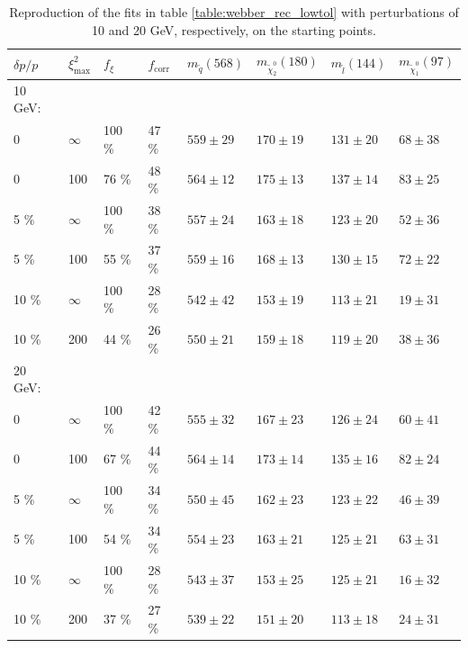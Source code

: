 \documentclass[twoside,english]{uiofysmaster}
\begin{document}


\begin{table}[hbt]
	\centering
	\begin{tabular}{| l | l | l | l  || l | l | l | l |}
		\hline
		$\delta p/p$ & $\xi^2_\mathrm{max}$ & $f_\xi$ & $f_\mathrm{corr}$ & $m_{\tilde q} (568)$ & $m_{\tilde \chi_2^0} (180)$ & $m_{\tilde l} (144)$ & $m_{\tilde \chi_1^0} (97)$ \\
		\hline \hline
		10 GeV: & & & & & & & \\ 
		\hline
		0 & 	$\infty$ &	100 \%	& 47 \%	& $559 \pm 29$	&	$170 \pm 19$	&	$131 \pm 20$	& 	$68 \pm 38$	\\
		0 &		100 &		76 \%	& 48 \% & $564 \pm 12$	&	$175 \pm 13$		&	$137 \pm 14$	&	$83 \pm 25$	\\
		5 \% &	$\infty$ &	100 \%	& 38 \% & $557 \pm 24$	& 	$163 \pm 18$	&	$123 \pm 20$&	$52 \pm 36$ \\
		5 \% &	100 &		55 \%	& 37 \% & $559 \pm 16$	&	$168 \pm 13$	& 	$130 \pm 15$	&	$72 \pm 22$	\\
		10 \% &	$\infty$ &	100 \%	& 28 \% & $542 \pm 42$	&	$153 \pm 19$	&	$113 \pm 21$&	$19 \pm 31$	\\
		10 \% &	200 &		44 \%	& 26 \% & $550 \pm 21$	& 	$159 \pm 18$	&	$119 \pm 20$&	$38 \pm 36$ \\
		\hline
		20 GeV: & & & & & & & \\ 
		\hline
		0 & 	$\infty$ &	100 \%	& 42 \%	& $555 \pm 32$	&	$167 \pm 23$	&	$126 \pm 24$	& 	$60 \pm 41$	\\
		0 &		100 &		67 \%	& 44 \% & $564 \pm 14$	&	$173 \pm 14$	&	$135 \pm 16$	&	$82 \pm 24$	\\
		5 \% &	$\infty$ &	100 \%	& 34 \% & $550 \pm 45$	& 	$162 \pm 23$	&	$123 \pm 22$&	$46 \pm 39$ \\
		5 \% &	100 &		54 \%	& 34 \% & $554 \pm 23$	&	$163 \pm 21$	& 	$125 \pm 21$	&	$63 \pm 31$	\\
		10 \% &	$\infty$ &	100 \%	& 28 \% & $543 \pm 37$	&	$153 \pm 25$	&	$125 \pm 21$&	$16 \pm 32$	\\
		10 \% &	200 &		37 \%	& 27 \% & $539 \pm 22$	& 	$151 \pm 20$	&	$113 \pm 18$&	$24 \pm 31$ \\
		\hline
	\end{tabular}
	\caption{Reproduction of the fits in table \ref{table:webber_rec_lowtol} with perturbations of 10 and 20 GeV, respectively, on the starting points.}
	\label{table:webber_rec_lowtol_perturbedSP}
\end{table}
\end{document}
